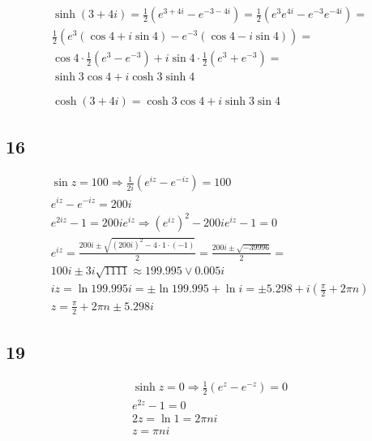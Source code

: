 \begin{gather*}
	\sinh{(3 + 4 i)}
	=
	\frac{1}{2} \left(
		e^{3 + 4 i} - e^{- 3 - 4 i}
	\right)
	=
	\frac{1}{2} \left(
		e^3 e^{4 i} - e^{-3} e^{-4 i}
	\right) =
	\\
	\frac{1}{2} \left(
		e^3 (\cos{4} + i \sin{4}) - e^{-3} (\cos{4} - i \sin{4})
	\right)
	=
	\\
	\cos{4} \cdot \frac{1}{2} \left(
		e^3 - e^{-3}
	\right)
	+
	i \sin{4} \cdot \frac{1}{2} \left(
		e^{3} + e^{-3}
	\right)
	=
	\\
	\sinh{3} \cos{4} + i \cosh{3} \sinh{4}
	\\
	\\
	\\
	\cosh{(3 + 4 i)} = \cosh{3} \cos{4} + i \sinh{3} \sin{4}
\end{gather*}


\subsection*{16}


\begin{gather*}
	\sin{z} = 100
	\Rightarrow
	\frac{1}{2 i} \left(
		e^{i z} - e^{-i z}
	\right) = 100
	\\
	e^{i z} - e^{-i z} = 200 i
	\\
	e^{2 i z} - 1 = 200 i e^{i z}
	\Rightarrow
	\left(e^{i z}\right)^2 - 200 i e^{i z} - 1 = 0
	\\
	e^{i z} = \frac{200 i \pm \sqrt{(200 i)^2 - 4 \cdot 1 \cdot (-1)}}{2}
	=
	\frac{200 i \pm \sqrt{- 39996}}{2}
	=
	\\
	100 i \pm 3 i \sqrt{1111} \approx 199.995 \vee 0.005 i
	\\
	i z = \ln{199.995 i} = \pm \ln{199.995} + \ln{i} = \pm 5.298 + i \left(\frac{\pi}{2} + 2 \pi n\right)
	\\
	z = \frac{\pi}{2} + 2 \pi n \pm 5.298 i
\end{gather*}


\subsection*{19}


\begin{gather*}
	\sinh{z} = 0
	\Rightarrow
	\frac{1}{2} \left(
		e^{z} - e^{-z}
	\right) = 0
	\\
	e^{2 z} - 1 = 0
	\\
	2 z = \ln{1} = 2 \pi n i
	\\
	z = \pi n i
\end{gather*}


